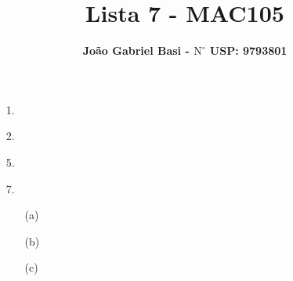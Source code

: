 \documentclass[12pt, a4paper]{article} %
\title{ \textbf{Lista 7 - MAC105}}
\date{}
\author{ \textbf{João Gabriel Basi - $\text{N}^\circ$ USP: 9793801}}
\begin{document}
\maketitle
\begin{enumerate}
\item[1.]

\item[2.]

\item[5.]

\item[7.]
\begin{enumerate}
\item[(a)]

\item[(b)]

\item[(c)]
\end{enumerate}
\end{enumerate}
\end{document}
